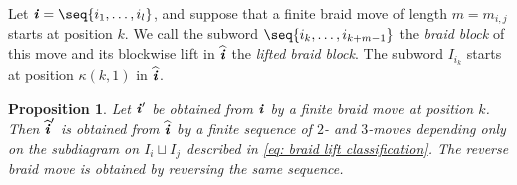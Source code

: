 \documentclass[12pt, leqno]{amsart}
\numberwithin{equation}{section}
\theoremstyle{plain}
\newtheorem{proposition}[lemma]{Proposition}
\theoremstyle{definition}
\newcommand{\ii}{ \textbf{\textit{i}}}
\newcommand{\hii}{{\widehat{\ii}}}
\begin{document}
Let $\ii=\seq{i_1,\ldots,i_l}$, and suppose that a finite braid move
of length $m=m_{i,j}$ starts at position $k$.
We call the subword $\seq{i_k,\ldots,i_{k+m-1}}$ the
\emph{braid block} of this move and its blockwise lift in $\hii$
the \emph{lifted braid block}.
The subword $I_{i_k}$ starts at position $\kappa(k,1)$ in $\hii$.

\begin{proposition}\label{prop: canonical finite braid lift}
Let $\ii'$ be obtained from $\ii$ by a finite braid move at position
$k$. Then $\hii'$ is obtained from $\hii$ by a finite sequence of
$2$- and $3$-moves  depending only on the subdiagram on $I_i\sqcup I_j$ described in
\eqref{eq: braid lift classification}. The reverse braid move is
obtained by reversing the same sequence.
\end{proposition}
\end{document}
